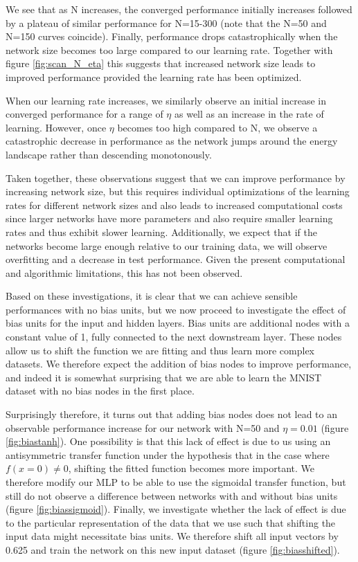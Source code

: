 \documentclass{article}
\begin{document}
\newpage

We see that as N increases, the converged performance initially increases followed by a plateau of similar performance for N=15-300 (note that the N=50 and N=150 curves coincide). Finally, performance drops catastrophically when the network size becomes too large compared to our learning rate. Together with figure \ref{fig:scan_N_eta} this suggests that increased network size leads to improved performance provided the learning rate has been optimized.

When our learning rate increases, we similarly observe an initial increase in converged performance for a range of $\eta$ as well as an increase in the rate of learning. However, once $\eta$ becomes too high compared to N, we observe a catastrophic decrease in performance as the network jumps around the energy landscape rather than descending monotonously.

Taken together, these observations suggest that we can improve performance by increasing network size, but this requires individual optimizations of the learning rates for different network sizes and also leads to increased computational costs since larger networks have more parameters and also require smaller learning rates and thus exhibit slower learning. Additionally, we expect that if the networks become large enough relative to our training data, we will observe overfitting and a decrease in test performance. Given the present computational and algorithmic limitations, this has not been observed.

Based on these investigations, it is clear that we can achieve sensible performances with no bias units, but we now proceed to investigate the effect of bias units for the input and hidden layers. Bias units are additional nodes with a constant value of 1, fully connected to the next downstream layer. These nodes allow us to shift the function we are fitting and thus learn more complex datasets. We therefore expect the addition of bias nodes to improve performance, and indeed it is somewhat surprising that we are able to learn the MNIST dataset with no bias nodes in the first place.

Surprisingly therefore, it turns out that adding bias nodes does not lead to an observable performance increase for our network with N=50 and $\eta=0.01$ (figure \ref{fig:biastanh}). One possibility is that this lack of effect is due to us using an antisymmetric transfer function under the hypothesis that in the case where $f(x = 0) \neq 0$, shifting the fitted function becomes more important. We therefore modify our MLP to be able to use the sigmoidal transfer function, but still do not observe a difference between networks with and without bias units (figure \ref{fig:biassigmoid}). Finally, we investigate whether the lack of effect is due to the particular representation of the data that we use such that shifting the input data might necessitate bias units. We therefore shift all input vectors by 0.625 and train the network on this new input dataset (figure \ref{fig:biasshifted}).
\end{document}
